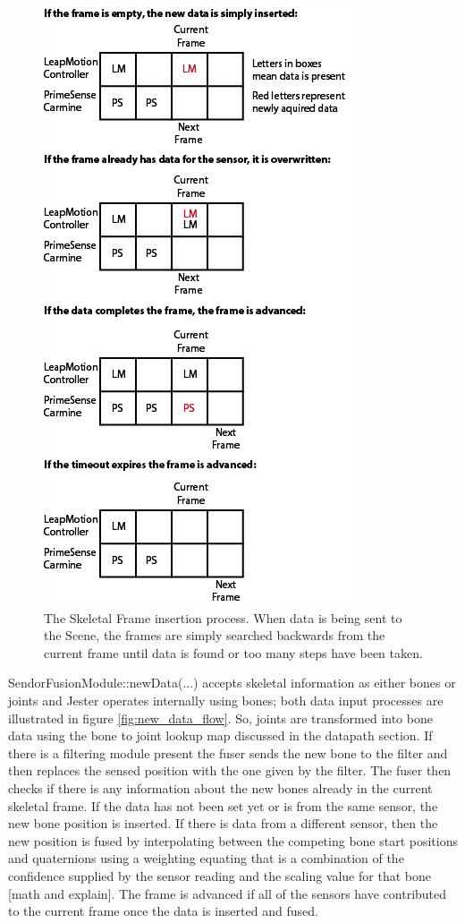 \begin{figure}[]
\centering
\includegraphics[width=.7\textwidth]{figures/frameFull}
\caption{The Skeletal Frame insertion process. When data is being sent to the Scene, the frames are simply searched backwards from the current frame until data is found or too many steps have been taken.}
\label{fig:skeleton_frames}
\end{figure}

SendorFusionModule::newData(...) accepts skeletal information as either bones or joints and Jester operates internally using bones; both data input processes are illustrated in figure \ref{fig:new_data_flow}. So, joints are transformed into bone data using the bone to joint lookup map discussed in the datapath section. If there is a filtering module present the fuser sends the new bone to the filter and then replaces the sensed position with the one given by the filter. The fuser then checks if there is any information about the new bones already in the current skeletal frame. If the data has not been set yet or is from the same sensor, the new bone position is inserted. If there is data from a different sensor, then the new position is fused by interpolating between the competing bone start positions and quaternions using a weighting equating that is a combination of the confidence supplied by the sensor reading and the scaling value for that bone [math and explain]. The frame is advanced if all of the sensors have contributed to the current frame once the data is inserted and fused. 

